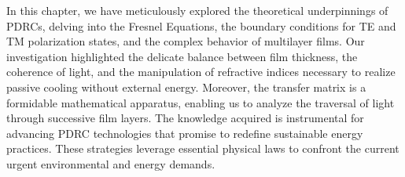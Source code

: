 In this chapter, we have meticulously explored the theoretical underpinnings of PDRCs, delving into the Fresnel Equations, the boundary conditions for TE and TM polarization states, and the complex behavior of multilayer films. Our investigation highlighted the delicate balance between film thickness, the coherence of light, and the manipulation of refractive indices necessary to realize passive cooling without external energy. Moreover, the transfer matrix is a formidable mathematical apparatus, enabling us to analyze the traversal of light through successive film layers. The knowledge acquired is instrumental for advancing PDRC technologies that promise to redefine sustainable energy practices. These strategies leverage essential physical laws to confront the current urgent environmental and energy demands.
